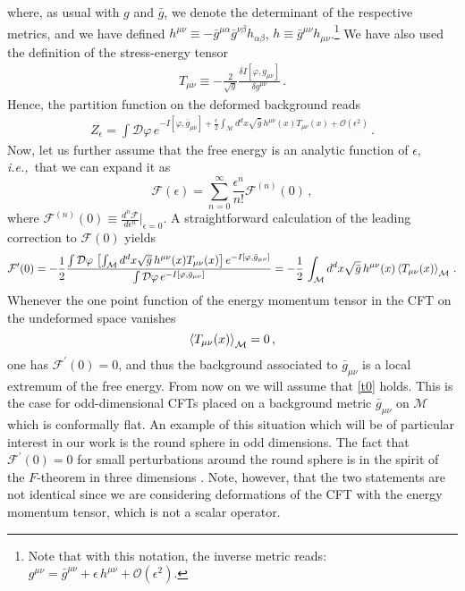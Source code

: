 \documentclass[12pt]{article}
\numberwithin{equation}{section}
\newcommand{\ie}{{\it i.e.,}\ }
\begin{document}
%
where, as usual with $g$ and $\bar{g}$, we denote the determinant of the respective metrics, and we have defined $h^{\mu\nu}\equiv-\bar{g}^{\mu\alpha} \bar{g}^{\nu\beta}h_{\alpha \beta}$, $h\equiv\bar{g}^{\mu\nu}h_{\mu\nu}$.\footnote{Note that with this notation, the inverse metric reads: $g^{\mu\nu}=\bar{g}^{\mu\nu}+  \epsilon\, h^{\mu\nu}+\mathcal{O}(\epsilon^2)$.} We have also used the definition of the stress-energy tensor
%
\begin{align}\label{Tmunudef}
T_{\mu\nu}\equiv-\frac{2}{\sqrt{g}}\frac{\delta I[\varphi,g_{\mu\nu}] }{\delta g^ {\mu\nu}}\, .
\end{align}
%
Hence, the partition function on the deformed background reads
%
\begin{align}
Z_{\epsilon}=\int \mathcal{D} \varphi\, e^{-I[\varphi,\bar{g}_{\mu\nu}]+\frac{\epsilon}{2}\int_{\mathcal{M}} d^dx \sqrt{\bar{g} }\, h^{\mu\nu}(x)T_{\mu\nu}(x)+\mathcal{O}(\epsilon^2)} \, .
\end{align}
%
Now, let us further assume that the free energy is an analytic function of $\epsilon$, \ie that we can expand it as
%
\begin{equation}\label{conj2}
\mathcal{F}(\epsilon)=\sum_{n=0}^{\infty} \frac{\epsilon^n}{n!} \mathcal{F}^ {(n)}(0)\, ,
\end{equation}
%
where $\mathcal{F}^ {(n)}(0) \equiv \frac{d^n\mathcal{F}}{d\epsilon^n}|_{\epsilon=0}$. A straightforward calculation of the leading correction to $\mathcal{F}(0)$ yields
%
\begin{equation}\label{conj33}
\mathcal{F}^{\prime}(0)=-\frac{1}{2}\frac{\int \mathcal{D} \varphi\,\left[\int_{\mathcal{M}} d^dx \sqrt{\bar{g} }\, h^{\mu\nu}(x)T_{\mu\nu}(x)\right] e^{-I[\varphi,\bar{g}_{\mu\nu}]}}{\int \mathcal{D} \varphi\, e^{-I[\varphi,\bar{g}_{\mu\nu}]}}=-\frac{1}{2}\,\int_{\mathcal{M}}  d^dx \sqrt{\bar{g} }\,h^{\mu\nu}(x)\braket{T_{\mu\nu}(x)}_{\mathcal{M}}   \, .
\end{equation}
%
Whenever the one point function of the energy momentum tensor in the CFT on the undeformed space vanishes
%
\begin{equation}\label{t0}
\braket{T_{\mu\nu}(x)}_{\mathcal{M}}=0\, , 
\end{equation}
%
one has $\mathcal{F}^{\prime}(0)=0$, and thus the background associated to $\bar{g}_{\mu\nu}$ is a local extremum of the free energy. From now on we will assume that \eqref{t0} holds. This is the case for odd-dimensional CFTs placed on a background metric $\bar{g}_{\mu\nu}$ on $\mathcal{M}$ which is conformally flat. An example of this situation which will be of particular interest in our work is the round sphere in odd dimensions. The fact that $\mathcal{F}^{\prime}(0)=0$ for small perturbations around the round sphere is in the spirit of the $F$-theorem in three dimensions \cite{Jafferis:2011zi,Klebanov:2011gs}. Note, however, that the two statements are not identical since we are considering deformations of the CFT with the energy momentum tensor, which is not a scalar operator.
\end{document}

